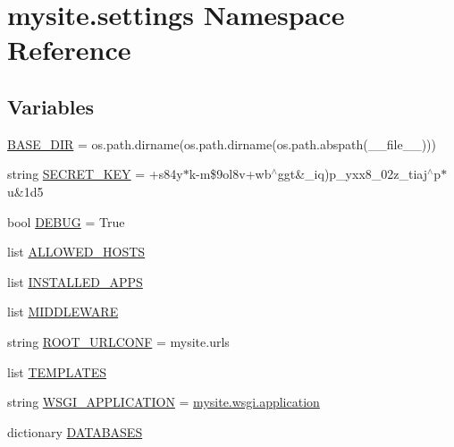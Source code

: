 \hypertarget{namespacemysite_1_1settings}{}\section{mysite.\+settings Namespace Reference}
\label{namespacemysite_1_1settings}
\subsection*{Variables}
\begin{DoxyCompactItemize}
\item 
\hyperlink{namespacemysite_1_1settings_a88bb6a8924ccca687362017da9110d54}{B\+A\+S\+E\+\_\+\+D\+IR} = os.\+path.\+dirname(os.\+path.\+dirname(os.\+path.\+abspath(\+\_\+\+\_\+file\+\_\+\+\_\+)))
\item 
string \hyperlink{namespacemysite_1_1settings_ab2aed82d2734b39d5387b22b7a953de5}{S\+E\+C\+R\+E\+T\+\_\+\+K\+EY} = \textquotesingle{}+s84y$\ast$k-\/m\$9ol8v+wb$^\wedge$ggt\&\+\_\+iq)p\+\_\+yxx8\+\_\+02z\+\_\+tiaj$^\wedge$p$\ast$u\&1d5\textquotesingle{}
\item 
bool \hyperlink{namespacemysite_1_1settings_af3cd9446472cd1e91fa265ae8440b2a1}{D\+E\+B\+UG} = True
\item 
list \hyperlink{namespacemysite_1_1settings_ab6f4415a608815b8ca5f84d320437cf8}{A\+L\+L\+O\+W\+E\+D\+\_\+\+H\+O\+S\+TS}
\item 
list \hyperlink{namespacemysite_1_1settings_ae0300504ffe212a8082806286d6fe36b}{I\+N\+S\+T\+A\+L\+L\+E\+D\+\_\+\+A\+P\+PS}
\item 
list \hyperlink{namespacemysite_1_1settings_a90df4fc7c17f07da22241f9ceb21f3b9}{M\+I\+D\+D\+L\+E\+W\+A\+RE}
\item 
string \hyperlink{namespacemysite_1_1settings_ab0a7fa8cdaaccbf5bf874db67cbe507a}{R\+O\+O\+T\+\_\+\+U\+R\+L\+C\+O\+NF} = \textquotesingle{}mysite.\+urls\textquotesingle{}
\item 
list \hyperlink{namespacemysite_1_1settings_a073a410822eed069da826d807a904fff}{T\+E\+M\+P\+L\+A\+T\+ES}
\item 
string \hyperlink{namespacemysite_1_1settings_a7e476bde6438ad8065a7d9f5b4a759ba}{W\+S\+G\+I\+\_\+\+A\+P\+P\+L\+I\+C\+A\+T\+I\+ON} = \textquotesingle{}\hyperlink{namespacemysite_1_1wsgi_aff79b59b99c8c1c837e143c516adfc7f}{mysite.\+wsgi.\+application}\textquotesingle{}
\item 
dictionary \hyperlink{namespacemysite_1_1settings_a04300628acd12c08ea63ee5f9d3d83d1}{D\+A\+T\+A\+B\+A\+S\+ES}
\item 

\end{DoxyCompactItemize}
